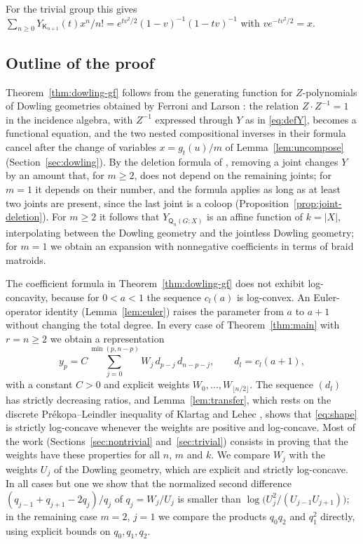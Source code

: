 \documentclass[11pt]{amsart}
\theoremstyle{definition}
\theoremstyle{remark}
\numberwithin{equation}{section}
\newcommand{\Q}{\mathsf{Q}}
\newcommand{\K}{\mathsf{K}}
\begin{document}
For the trivial group this gives $\sum_{n\ge0}Y_{\K_{n+1}}(t)x^n/n!=e^{tv^2/2}(1-v)^{-1}(1-tv)^{-1}$ with $ve^{-tv^2/2}=x$.

\subsection*{Outline of the proof}
Theorem~\ref{thm:dowling-gf} follows from the generating function for $Z$-polynomials of Dowling geometries obtained by Ferroni and Larson \cite{FL24,FL26}: the relation $Z\cdot Z^{-1}=1$ in the incidence algebra, with $Z^{-1}$ expressed through $Y$ as in \eqref{eq:defY}, becomes a functional equation, and the two nested compositional inverses in their formula cancel after the change of variables $x=g_t(u)/m$ of Lemma~\ref{lem:uncompose} (Section~\ref{sec:dowling}). By the deletion formula of \cite{BFMN25}, removing a joint changes $Y$ by an amount that, for $m\ge2$, does not depend on the remaining joints; for $m=1$ it depends on their number, and the formula applies as long as at least two joints are present, since the last joint is a coloop (Proposition~\ref{prop:joint-deletion}). For $m\ge2$ it follows that $Y_{\Q_n(G;X)}$ is an affine function of $k=|X|$, interpolating between the Dowling geometry and the jointless Dowling geometry; for $m=1$ we obtain an expansion with nonnegative coefficients in terms of braid matroids.

The coefficient formula in Theorem~\ref{thm:dowling-gf} does not exhibit log-concavity, because for $0<a<1$ the sequence $c_l(a)$ is log-convex. An Euler-operator identity (Lemma~\ref{lem:euler}) raises the parameter from $a$ to $a+1$ without changing the total degree. In every case of Theorem~\ref{thm:main} with $r=n\ge2$ we obtain a representation
\begin{equation}\label{eq:shape}
y_p=C\sum_{j=0}^{\min(p,n-p)}W_j\,d_{p-j}\,d_{n-p-j},\qquad d_l=c_l(a+1),
\end{equation}
with a constant $C>0$ and explicit weights $W_0,\dots,W_{\lfloor n/2\rfloor}$. The sequence $(d_l)$ has strictly decreasing ratios, and Lemma~\ref{lem:transfer}, which rests on the discrete Pr\'ekopa--Leindler inequality of Klartag and Lehec \cite{KL19}, shows that \eqref{eq:shape} is strictly log-concave whenever the weights are positive and log-concave. Most of the work (Sections~\ref{sec:nontrivial} and~\ref{sec:trivial}) consists in proving that the weights have these properties for all $n$, $m$ and $k$. We compare $W_j$ with the weights $U_j$ of the Dowling geometry, which are explicit and strictly log-concave. In all cases but one we show that the normalized second difference $(q_{j-1}+q_{j+1}-2q_j)/q_j$ of $q_j=W_j/U_j$ is smaller than $\log\bigl(U_j^2/(U_{j-1}U_{j+1})\bigr)$; in the remaining case $m=2$, $j=1$ we compare the products $q_0q_2$ and $q_1^2$ directly, using explicit bounds on $q_0,q_1,q_2$.
\end{document}
